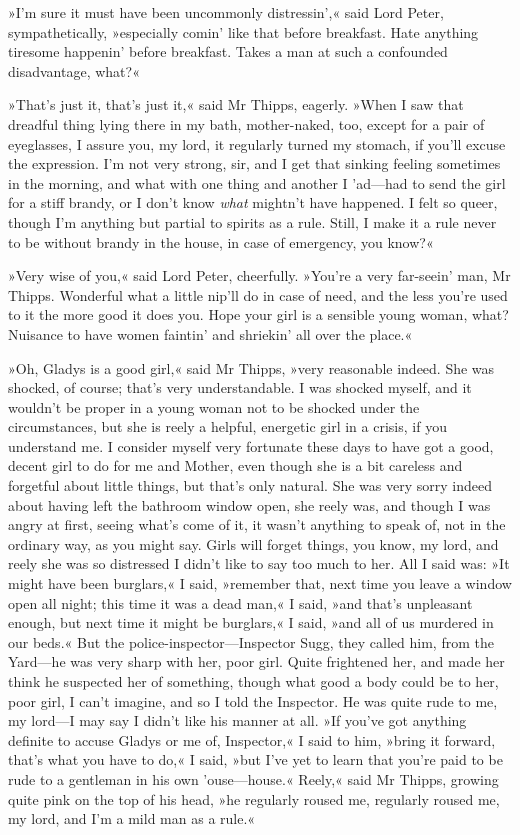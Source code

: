 »I'm sure it must have been uncommonly distressin',« said Lord Peter, sympathetically, »especially comin' like that before breakfast. Hate anything tiresome happenin' before breakfast. Takes a man at such a confounded disadvantage, what?«

»That's just it, that's just it,« said Mr Thipps, eagerly. »When I saw that dreadful thing lying there in my bath, mother-naked, too, except for a pair of eyeglasses, I assure you, my lord, it regularly turned my stomach, if you'll excuse the expression. I'm not very strong, sir, and I get that sinking feeling sometimes in the morning, and what with one thing and another I 'ad\allowbreak---\allowbreak had to send the girl for a stiff brandy, or I don't know \textit{what} mightn't have happened. I felt so queer, though I'm anything but partial to spirits as a rule. Still, I make it a rule never to be without brandy in the house, in case of emergency, you know?«

»Very wise of you,« said Lord Peter, cheerfully. »You're a very far-seein' man, Mr Thipps. Wonderful what a little nip'll do in case of need, and the less you're used to it the more good it does you. Hope your girl is a sensible young woman, what? Nuisance to have women faintin' and shriekin' all over the place.«

»Oh, Gladys is a good girl,« said Mr Thipps, »very reasonable indeed. She was shocked, of course; that's very understandable. I was shocked myself, and it wouldn't be proper in a young woman not to be shocked under the circumstances, but she is reely a helpful, energetic girl in a crisis, if you understand me. I consider myself very fortunate these days to have got a good, decent girl to do for me and Mother, even though she is a bit careless and forgetful about little things, but that's only natural. She was very sorry indeed about having left the bathroom window open, she reely was, and though I was angry at first, seeing what's come of it, it wasn't anything to speak of, not in the ordinary way, as you might say. Girls will forget things, you know, my lord, and reely she was so distressed I didn't like to say too much to her. All I said was: »It might have been burglars,« I said, »remember that, next time you leave a window open all night; this time it was a dead man,« I said, »and that's unpleasant enough, but next time it might be burglars,« I said, »and all of us murdered in our beds.« But the police-inspector\allowbreak---\allowbreak Inspector Sugg, they called him, from the Yard\allowbreak---\allowbreak he was very sharp with her, poor girl. Quite frightened her, and made her think he suspected her of something, though what good a body could be to her, poor girl, I can't imagine, and so I told the Inspector. He was quite rude to me, my lord\allowbreak---\allowbreak I may say I didn't like his manner at all. »If you've got anything definite to accuse Gladys or me of, Inspector,« I said to him, »bring it forward, that's what you have to do,« I said, »but I've yet to learn that you're paid to be rude to a gentleman in his own 'ouse\allowbreak---\allowbreak house.« Reely,« said Mr Thipps, growing quite pink on the top of his head, »he regularly roused me, regularly roused me, my lord, and I'm a mild man as a rule.«

